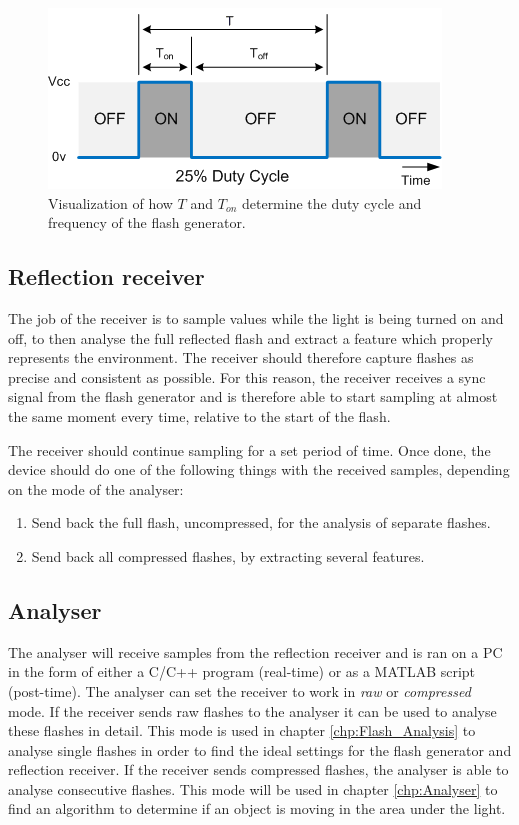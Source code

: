 \begin{figure}[]
	\centering
	\includegraphics[]{pics/DutyCycle.png}
	\caption{Visualization of how $T$ and $T_{on}$ determine the duty cycle and frequency of the flash generator.\label{fig:DutyCycle}}
\end{figure}

\subsection{Reflection receiver}
The job of the receiver is to sample values while the light is being turned on and off, to then analyse the full reflected flash and extract a feature which properly represents the environment. The receiver should therefore capture flashes as precise and consistent as possible. For this reason, the receiver receives a sync signal from the flash generator and is therefore able to start sampling at almost the same moment every time, relative to the start of the flash. 

The receiver should continue sampling for a set period of time. Once done, the device should do one of the following things with the received samples, depending on the mode of the analyser:
\begin{enumerate}[itemsep=-1ex,topsep=0pt]
	\item Send back the full flash, uncompressed, for the analysis of separate flashes.
	\item Send back all compressed flashes, by extracting several features.
\end{enumerate}

\subsection{Analyser}
The analyser will receive samples from the reflection receiver and is ran on a PC in the form of either a C/C++ program (real-time) or as a MATLAB script (post-time). The analyser can set the receiver to work in \textit{raw} or \textit{compressed} mode. If the receiver sends raw flashes to the analyser it can be used to analyse these flashes in detail. This mode is used in chapter \ref{chp:Flash_Analysis} to analyse single flashes in order to find the ideal settings for the flash generator and reflection receiver. If the receiver sends compressed flashes, the analyser is able to analyse consecutive flashes. This mode will be used in chapter \ref{chp:Analyser} to find an algorithm to determine if an object is moving in the area under the light.

